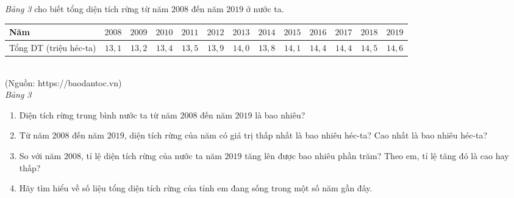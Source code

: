 \begin{bt}%
	\textit{Bảng 3} cho biết tổng diện tích rừng từ năm $2008$ đến năm $2019$ ở nước ta.
	\begin{center}
		\begin{tabular}{|p{2.2cm}|c|c|c|c|c|c|c|c|c|c|c|c|}
			\hline 
			\centering Năm	&$2008$&$2009$&$2010$&$2011$&$2012$&$2013$&$2014$&$2015$&$2016$& $2017$&$2018$&$2019$\\
			\hline 
			\centering Tổng DT (triệu héc-ta)&$13{,}1$	&$13{,}2$	&$13{,}4$& $13{,}5$ &$13{,}9$ &$14{,}0$&$13{,}8$ &$14{,}1$ &$14{,}4$ &$14{,}4$&$14{,}5$&$14{,}6$ \\
			\hline 
		\end{tabular}
		\\
		\hfill (Nguồn: https://baodantoc.vn)\\
		\textit{Bảng 3}
	\end{center}
	\begin{enumerate}
		\item Diện tích rừng trung bình nước ta từ năm $2008$ đến năm $2019$ là bao nhiêu?
		\item Từ năm $2008$ đến năm $2019$, diện tích rừng của năm có giá trị thấp nhất là bao nhiêu héc-ta? Cao nhất là bao nhiêu héc-ta?
		\item So với năm $2008$, tỉ lệ diện tích rừng của nước ta năm $2019$ tăng lên được bao nhiêu phần trăm? Theo em, tỉ lệ tăng đó là cao hay thấp?
		\item Hãy tìm hiểu về số liệu tổng diện tích rừng của tỉnh em đang sống trong một số năm gần đây.
	\end{enumerate}
\end{bt}
